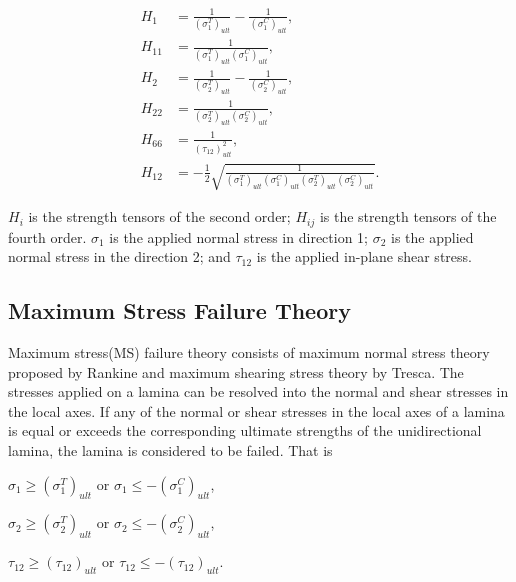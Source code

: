 \begin{equation}
	\begin{split}
		H_{1}&=\frac{1}{\left(\sigma_{1}^{T}\right)_{u l
		t}}-\frac{1}{\left(\sigma_{1}^{C}\right)_{u l t}} \textstyle{,} \\
		H_{11}&=\frac{1}{\left(\sigma_{1}^{T}\right)_{u l t}\left(\sigma_{1}^{C}\right)_{u l t}} \textstyle{,}\\
		H_{2}&=\frac{1}{\left(\sigma_{2}^{T}\right)_{u l t}}-\frac{1}{\left(\sigma_{2}^{C}\right)_{u l t}} \textstyle{,}\\
		H_{22}&=\frac{1}{\left(\sigma_{2}^{T}\right)_{u l t}\left(\sigma_{2}^{C}\right)_{u l t}} \textstyle{,}\\
		H_{66}&=\frac{1}{\left(\tau_{12}\right)_{u l t}^{2}} \textstyle{,}\\
		H_{12}&=-\frac{1}{2} \sqrt{\frac{1}{\left(\sigma_{1}^{T}\right)_{u l
		t}\left(\sigma_{1}^{C}\right)_{u l t}\left(\sigma_{2}^{T}\right)_{u l
		t}\left(\sigma_{2}^{C}\right)_{u l t}}}\textstyle{.}
	\end{split}
\end{equation}

$H_i$ is the strength tensors of the second order; $H_{ij}$ is the strength
tensors of the fourth order. $\sigma_1$ is the applied normal stress in 
direction 1; $\sigma_2$ is the applied normal stress in the direction 2; and
$\tau_{12}$ is the applied in-plane shear stress.




\subsection{Maximum Stress Failure Theory}

Maximum stress(MS) failure theory consists of maximum normal stress theory
proposed by Rankine and maximum shearing stress theory by Tresca. The stresses
applied on a lamina can be resolved into the normal and shear stresses in the
local axes. If any of the normal or shear stresses in the local axes of a lamina
is equal or exceeds the corresponding ultimate strengths of the unidirectional
lamina, the lamina is considered to be failed. That is

$\sigma_1 \geq (\sigma _1^{T})_{ult} $ or $\sigma_1 \leq -(\sigma _1^{C})_{ult}
$,

$\sigma_2 \geq (\sigma _2^{T})_{ult} $ or $\sigma_2 \leq -(\sigma _2^{C})_{ult}
$,

$\tau_{12} \geq (\tau_{12})_{ult} $  or $\tau_{12} \leq -(\tau_{12})_{ult} $.

